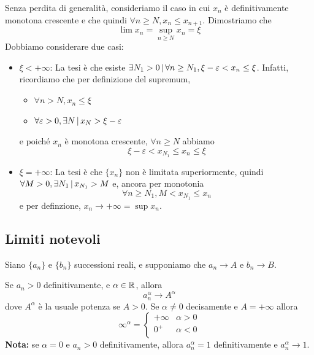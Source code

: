 \documentclass[a4paper]{article}
\begin{document}
\begin{snippetproof}{}
    Senza perdita di generalità, consideriamo il caso in cui \(x_n\) è definitivamente monotona crescente
    e che quindi \(\forall n \geq N, x_n \leq x_{n+1}\). Dimostriamo che
    \[
        \lim x_n = \sup_{n \geq N} x_n = \xi
    \]
    Dobbiamo considerare due casi:
    \begin{itemize}
        \item \(\xi < +\infty\): La tesi è che esiste \(\exists N_1 > 0 \,|\, \forall n \geq N_1, \xi-\varepsilon < x_n \leq \xi\).
            Infatti, ricordiamo che per definizione del supremum,
            \begin{itemize}
                \item \(\forall n>N, x_n \leq \xi\)
                \item \(\forall \varepsilon>0, \exists N \,|\, x_N > \xi - \varepsilon\)
            \end{itemize}
            e poiché \(x_n\) è monotona crescente, \(\forall n \geq N\) abbiamo
            \[
                \xi - \varepsilon < x_{N_1} \leq x_n \leq \xi
            \]
        \item \(\xi = +\infty\): La tesi è che \(\{x_n\}\) non è limitata superiormente, quindi
        \(\forall M > 0, \exists N_1 \,|\, x_{N_1} > M\) e, ancora per monotonia
        \[
            \forall n \geq N_1, M < x_{N_1} \leq x_n
        \]
        e per definzione, \(x_n \to +\infty = \sup x_n\).  
    \end{itemize}
\end{snippetproof}

\subsection{Limiti notevoli}

Siano \(\{a_n\}\) e \(\{b_n\}\) successioni reali, e supponiamo che
\(a_n \to A\) e \(b_n \to B\).

\begin{snippetproposition}{}
    Se \(a_n > 0\) definitivamente, e \(\alpha\in\mathbb{R}\), allora
    \[
        a_n^\alpha \to A^\alpha
    \]
    dove \(A^\alpha\) è la usuale potenza se \(A > 0\).
    Se \(\alpha\neq 0\) decisamente e \(A = +\infty\) allora
    \[
        \infty^\alpha = \begin{cases}
            +\infty & \alpha > 0 \\
            0^+ & \alpha < 0 \\
        \end{cases}
    \]
    \textbf{Nota:} se \(\alpha = 0\) e \(a_n > 0\) definitivamente, allora \(a_n^\alpha = 1\) definitivamente
    e \(a_n^\alpha \to 1\).
\end{snippetproposition}
\end{document}
